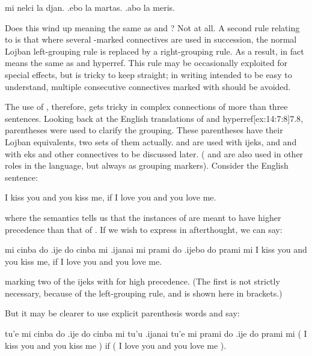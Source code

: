 \begin{example}
mi nelci la djan. .ebo la martas. .abo la meris.
\end{example}

Does this wind up meaning the same as  and ? Not at all. A
    second rule relating to  is that where several
    -marked connectives are used in succession, the normal
    Lojban left-grouping rule is replaced by a right-grouping rule.
    As a result,  in fact means the
    same as  and hyperref. This rule may be occasionally exploited
    for special effects, but is tricky to keep straight; in writing
    intended to be easy to understand, multiple consecutive
    connectives marked with  should be avoided. 

The use of , therefore, gets tricky in complex
    connections of more than three sentences. Looking back at the
    English translations of  and
    hyperref[ex:14:7:8]{7.8}, parentheses were used to clarify the
    grouping. These parentheses have their Lojban equivalents, two
    sets of them actually.  and  are used with
    ijeks, and  and  with eks and other connectives
    to be discussed later. ( and  are also used in
    other roles in the language, but always as grouping markers).
    Consider the English sentence:
\begin{example}
I kiss you and you kiss me,\n
\T	if I love you and you love me.
\end{example}

{\noindent}where the semantics tells us that the instances of  are
    meant to have higher precedence than that of . If we wish
    to express  in afterthought, we
    can say:
\begin{example}
mi cinba do .ije do cinba mi\n
\T	.ijanai mi prami do .ijebo do prami mi\n
I kiss you and you kiss me,\n
\T	if I love you and you love me.
\end{example}

{\noindent}marking two of the ijeks with  for high precedence. (The
    first  is not strictly necessary, because of the
    left-grouping rule, and is shown here in brackets.) 

But it may be clearer to use explicit parenthesis words and
    say:
\begin{example}
tu'e mi cinba do .ije do cinba mi tu'u\n
\T	.ijanai tu'e mi prami do .ije do prami mi \n
( I kiss you and you kiss me )\n
\T	if ( I love you and you love me ).
\end{example}

